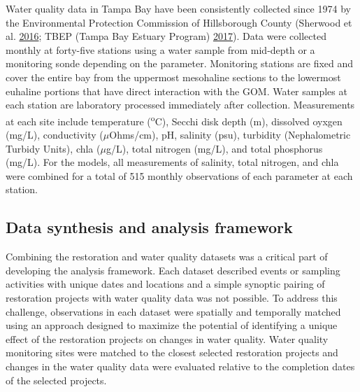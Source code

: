 \documentclass[]{article}
\begin{document}
Water quality data in Tampa Bay have been consistently collected since
1974 by the Environmental Protection Commission of Hillsborough County
(Sherwood et al. \protect\hyperlink{ref-Sherwood16}{2016}; TBEP (Tampa
Bay Estuary Program) \protect\hyperlink{ref-TBEP17}{2017}). Data were
collected monthly at forty-five stations using a water sample from
mid-depth or a monitoring sonde depending on the parameter. Monitoring
stations are fixed and cover the entire bay from the uppermost
mesohaline sections to the lowermost euhaline portions that have direct
interaction with the GOM. Water samples at each station are laboratory
processed immediately after collection. Measurements at each site
include temperature (\textsuperscript{o}C), Secchi disk depth (m),
dissolved oyxgen (mg/L), conductivity (\(\mu\)Ohms/cm), pH, salinity
(psu), turbidity (Nephalometric Turbidy Units), \ac{chla} (\(\mu\)g/L),
total nitrogen (mg/L), and total phosphorus (mg/L). For the models, all
measurements of salinity, total nitrogen, and \ac{chla} were combined
for a total of 515 monthly observations of each parameter at each
station.

\hypertarget{data-synthesis-and-analysis-framework}{%
\subsection{Data synthesis and analysis
framework}\label{data-synthesis-and-analysis-framework}}

Combining the restoration and water quality datasets was a critical part
of developing the analysis framework. Each dataset described events or
sampling activities with unique dates and locations and a simple
synoptic pairing of restoration projects with water quality data was not
possible. To address this challenge, observations in each dataset were
spatially and temporally matched using an approach designed to maximize
the potential of identifying a unique effect of the restoration projects
on changes in water quality. Water quality monitoring sites were matched
to the closest selected restoration projects and changes in the water
quality data were evaluated relative to the completion dates of the
selected projects.
\end{document}
